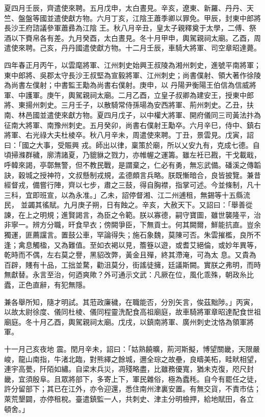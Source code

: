 \begin{pinyinscope}
 夏四月壬辰，齊遣使來聘。五月戊申，太白晝見。辛亥，遼東、新羅、丹丹、天竺、盤盤等國並遣使獻方物。六月丁亥，江陰王蕭季卿以罪免。甲辰，封東中郎將長沙王府諮議參軍蕭彞為江陰
 王。秋八月辛丑，皇太子親釋奠于太學，二傅、祭酒以下賚帛各有差。九月癸酉，太白晝見。冬十月甲申，輿駕親祠太廟。乙酉，周遣使來聘。己亥，丹丹國遣使獻方物。十二月壬辰，車騎大將軍、司空章昭達薨。



 四年春正月丙午，以雲麾將軍、江州刺史始興王叔陵為湘州刺史，進號平南將軍；東中郎將、吳郡太守長沙王叔堅為宣毅將軍、江州刺史；尚書僕射、領大著作徐陵為尚書左僕射；中書監王勱為尚書右僕射。庚申，以
 丹陽尹衡陽王伯信為信威將軍、中護軍。庚午，輿駕親祠太廟。二月乙酉，立皇子叔卿為建安王，授東中郎將、東揚州刺史。三月壬子，以散騎常侍孫瑒為安西將軍、荊州刺史。乙丑，扶南、林邑國並遣使來獻方物。夏四月戊子，以中權大將軍、開府儀同三司黃法抃為征南大將軍、南豫州刺史。五月癸卯，尚書右僕射王勱卒。六月辛巳，侍中、鎮右將軍、右光祿大夫杜棱卒。秋八月辛未，周遣使來聘。丁丑，景雲見。戊寅，詔曰：「國之大事，受賑興
 戎。師出以律，稟策於廟，所以乂安九有，克成七德。自頃掃滌群穢，廓清諸夏，乃貔貅之戮力，亦帷幄之運籌。雖左衽已戡，干戈載戢，呼韓來謁，亭鄣無警，但不教民戰，是謂棄之，仁必有勇，無忘武備。磻溪之傳韜訣，穀城之授神符，文叔懸制戎規，孟德頗言兵略。朕既慚暗合，良皆披覽。兼昔經督戎，備嘗行陣，齊以七步，肅之三鼓，得自胸襟，指掌可述。今並條制，凡十三科，宜即班宣，以為永准。」乙未，詔停督湘、江二州逋租，無錫等十五縣流民，
 並蠲其徭賦。九月庚子朔，日有蝕之。辛亥，大赦天下。又詔曰：「舉善從諫，在上之明規；進賢謁言，為臣之令範。朕以寡德，嗣守寶圖，雖世襲隆平，治非寧一。辨方分職，旰食早衣；傍闕爭臣，下無貢士。何其闕爾，鮮能抗直。豈余獨運，匪薦讜言。置鼓公車，罕論得失；施石象魏，莫陳可否。朱雲摧檻，良所不逢；禽息觸楹，又為難值。至如衣褐以見，簷簦以遊，或耆艾絕倫，或妙年異等，乾時而不偶，左右莫之譽，黑貂改弊，黃金且殫，終其滯淹，可為太
 息。又貴為百辟，賤有十品，工拙並騖，勸沮莫分，街謠徒擁，廷議斯闕。實朕之弗明，而時無獻替。永言至治，何迺爽歟？外可通示文武：凡厥在位，風化乖殊，朝政糸比蠹，正色直辭，有犯無隱。



 兼各舉所知，隨才明試。其蒞政廉穢，在職能否，分別矢言，俟茲黜陟。」丙寅，以故太尉徐度、儀同杜棱、儀同程靈洗配食高祖廟庭，故車騎將軍章昭達配食世祖廟庭。冬十月乙酉，輿駕親祠太廟。戊戌，以鎮南將軍、廣州刺史沈恪為領軍將軍。



 十一月己亥夜地
 震。閏月辛未，詔曰：「姑熟饒曠，荊河斯擬，博望關畿，天限嚴峻，龍山南指，牛渚北臨，對熊繹之餘城，邇全琮之故壘，良疇美柘，畦畎相望，連宇高甍，阡陌如繡。自梁末兵災，凋殘略盡，比雖務優寬，猶未克復，咫尺封畿，宜須殷阜。且眾將部下，多寄上下，軍民雜俗，極為蠹秏。自今有罷任之徒，許分留部下；其已在江外，亦令迎還，悉住南州津裏安置。有無交貨，不責市估；萊荒墾闢，亦停租稅。臺遣鎮監一人，共刺史、津主分明檢押，給地賦田，各立
 頓舍。」




\end{pinyinscope}
